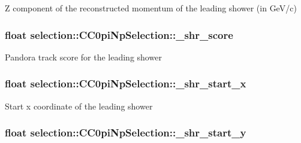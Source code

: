 Z component of the reconstructed momentum of the leading shower (in Ge\-V/c) \hypertarget{classselection_1_1CC0piNpSelection_a9033ad097ef1b7a4e10b2b872b82f068}{
\subsubsection[{\-\_\-shr\-\_\-score}]{\setlength{\rightskip}{0pt plus 5cm}float selection\-::\-C\-C0pi\-Np\-Selection\-::\-\_\-shr\-\_\-score\hspace{0.3cm}{\ttfamily [private]}}}\label{classselection_1_1CC0piNpSelection_a9033ad097ef1b7a4e10b2b872b82f068}
Pandora track score for the leading shower \hypertarget{classselection_1_1CC0piNpSelection_ac0fb4dbd656f2f3fb2c12ffc02a0df7c}{
\subsubsection[{\-\_\-shr\-\_\-start\-\_\-x}]{\setlength{\rightskip}{0pt plus 5cm}float selection\-::\-C\-C0pi\-Np\-Selection\-::\-\_\-shr\-\_\-start\-\_\-x\hspace{0.3cm}{\ttfamily [private]}}}\label{classselection_1_1CC0piNpSelection_ac0fb4dbd656f2f3fb2c12ffc02a0df7c}
Start x coordinate of the leading shower \hypertarget{classselection_1_1CC0piNpSelection_ade6717f479b053a2c2c9082e597d599f}{
\subsubsection[{\-\_\-shr\-\_\-start\-\_\-y}]{\setlength{\rightskip}{0pt plus 5cm}float selection\-::\-C\-C0pi\-Np\-Selection\-::\-\_\-shr\-\_\-start\-\_\-y\hspace{0.3cm}{\ttfamily [private]}}}\label{classselection_1_1CC0piNpSelection_ade6717f479b053a2c2c9082e597d599f}

